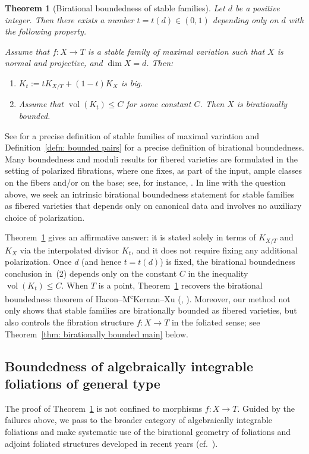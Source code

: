 \documentclass[11pt,reqno]{amsart}
\numberwithin{equation}{section}
\newcommand{\vol}{\operatorname{vol}}
\newtheorem{alphthm}{Theorem}
\theoremstyle{definition}
\begin{document}
\begin{alphthm}[Birational boundedness of stable families]\label{thm: stable family birational boundedness}
    Let $d$ be a positive integer. Then there exists a number $t=t(d)\in(0,1)$ depending only on $d$ with the following property.
    

    Assume that $f\colon X\to T$ is a stable family of maximal variation such that $X$ is normal and projective, and $\dim X=d$. Then:
    \begin{enumerate}
        \item $K_{t}:=tK_{X/T}+(1-t)K_X$ is big.
        \item Assume that $\vol(K_t)\leq C$ for some constant $C$. Then $X$ is birationally bounded.
    \end{enumerate}
\end{alphthm}
See \cite[Definition~6.16]{KP17} for a precise definition of stable families of maximal variation and Definition~\ref{defn: bounded pairs} for a precise definition of birational boundedness. Many boundedness and moduli results for fibered varieties are formulated in the setting of polarized fibrations, where one fixes, as part of the input, ample classes on the fibers and/or on the base; see, for instance, \cite{Bir22,Bir23a,Jia23,Bej+24,Bir24,BDCS24,Fil24,HH25a,HH25b,ISZ25,IZ25,Jia25a,Jia25b,JJZ25,Zhu25}. In line with the question above, we seek an intrinsic birational boundedness statement for stable families as fibered varieties that depends only on canonical data and involves no auxiliary choice of polarization.

Theorem~\ref{thm: stable family birational boundedness} gives an affirmative answer: it is stated solely in terms of $K_{X/T}$ and $K_X$ via the interpolated divisor $K_t$, and it does not require fixing any additional polarization. Once $d$ (and hence $t=t(d)$) is fixed, the birational boundedness conclusion in~(2) depends only on the constant $C$ in the inequality $\vol(K_t)\leq C$. When $T$ is a point, Theorem~\ref{thm: stable family birational boundedness} recovers the birational boundedness theorem of Hacon--M\textsuperscript{c}Kernan--Xu (\cite[Theorem~3.1]{HMX13}, \cite[Theorem~1.3]{HMX14}). Moreover, our method not only shows that stable families are birationally bounded as fibered varieties, but also controls the fibration structure $f\colon X\to T$ in the foliated sense; see Theorem~\ref{thm: birationally bounded main} below.

\subsection{Boundedness of algebraically integrable foliations of general type}
The proof of Theorem~\ref{thm: stable family birational boundedness} is not confined to morphisms $f\colon X\to T$. Guided by the failures above, we pass to the broader category of algebraically integrable foliations and make systematic use of the birational geometry of foliations and adjoint foliated structures developed in recent years (cf.~\cite{PS19,ACSS21,CHLX23,SS23,Cas+24,LW24,Cas+25a,Cas+25b,CS25c,LX25,LMX25}).
\end{document}
